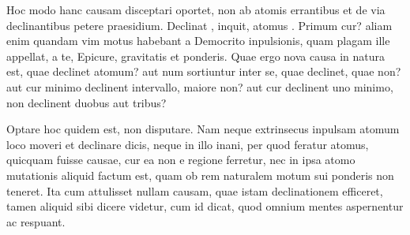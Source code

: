  Hoc modo hanc causam disceptari oportet, non ab atomis errantibus et de via declinantibus petere praesidium. Declinat , inquit, atomus . Primum cur? aliam enim quandam vim motus habebant a Democrito inpulsionis, quam plagam ille appellat, a te, Epicure, gravitatis et ponderis. Quae ergo nova causa in natura est, quae declinet atomum? aut num sortiuntur inter se, quae declinet, quae non? aut cur minimo declinent intervallo, maiore non? aut cur declinent uno minimo, non declinent duobus aut tribus?

 Optare hoc quidem est, non disputare. Nam neque extrinsecus inpulsam atomum loco moveri et declinare dicis, neque in illo inani, per quod feratur atomus, quicquam fuisse causae, cur ea non e regione ferretur, nec in ipsa atomo mutationis aliquid factum est, quam ob rem naturalem motum sui ponderis non teneret. Ita cum attulisset nullam causam, quae istam declinationem efficeret, tamen aliquid sibi dicere videtur, cum id dicat, quod omnium mentes aspernentur ac respuant.

